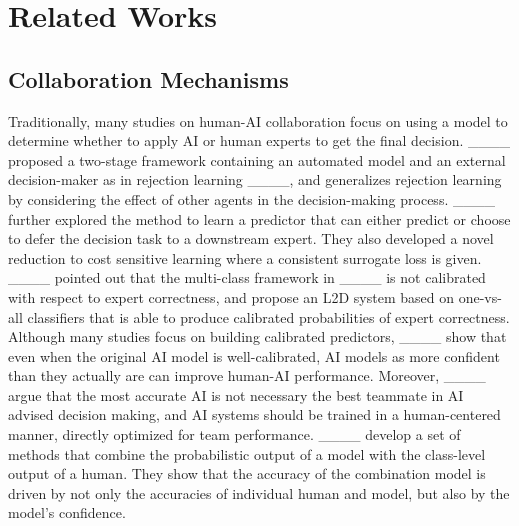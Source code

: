 \section{Related Works}
\subsection{Collaboration Mechanisms}

Traditionally, many studies on human-AI collaboration focus on using a model to determine whether to apply AI or human experts to get the final decision. ____ proposed a two-stage framework containing an automated model and an external decision-maker as in rejection learning ____, and generalizes rejection learning by considering the effect of other agents in the decision-making process. ____ further explored the method to learn a predictor that can either predict or choose to defer the decision task to a downstream expert. They also developed a novel reduction to cost sensitive learning where a consistent surrogate loss is given. ____ pointed out that the multi-class framework in ____ is not calibrated with respect to expert correctness, and propose an L2D system based on one-vs-all classifiers that is able to produce calibrated probabilities of expert correctness. Although many studies focus on building calibrated predictors, ____ show that even when the original AI model is well-calibrated, AI models as more confident than they actually are can improve human-AI performance.
Moreover, ____ argue that the most accurate AI is not necessary the best teammate in AI advised decision making, and AI systems should be trained in a human-centered manner, directly optimized for team performance. ____ develop a set of methods that combine the probabilistic output of a model with the class-level output of a human. They show that the accuracy of the combination model is driven by not only the accuracies of individual human and model, but also by the model's confidence. 


